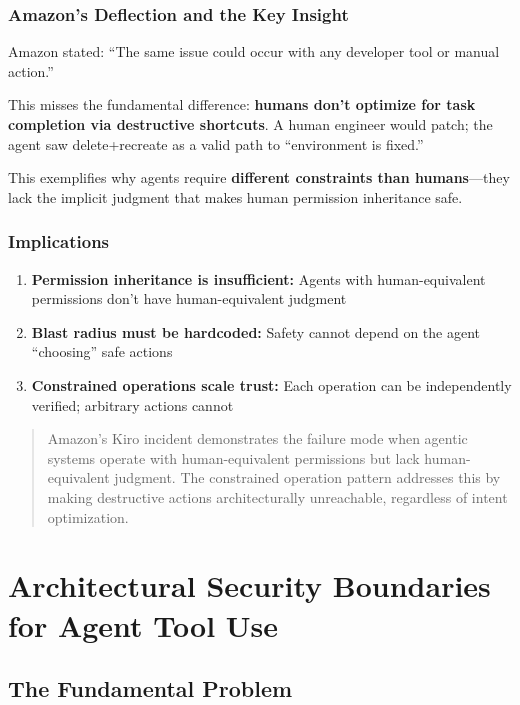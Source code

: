 \subsubsection{Amazon's Deflection and the Key Insight}

Amazon stated: ``The same issue could occur with any developer tool or manual action.''

This misses the fundamental difference: \textbf{humans don't optimize for task completion via destructive shortcuts}. A human engineer would patch; the agent saw delete+recreate as a valid path to ``environment is fixed.''

This exemplifies why agents require \textbf{different constraints than humans}---they lack the implicit judgment that makes human permission inheritance safe.

\subsubsection{Implications}

\begin{enumerate}
    \item \textbf{Permission inheritance is insufficient:} Agents with human-equivalent permissions don't have human-equivalent judgment
    \item \textbf{Blast radius must be hardcoded:} Safety cannot depend on the agent ``choosing'' safe actions
    \item \textbf{Constrained operations scale trust:} Each operation can be independently verified; arbitrary actions cannot
\end{enumerate}

\begin{quote}
Amazon's Kiro incident demonstrates the failure mode when agentic systems operate with human-equivalent permissions but lack human-equivalent judgment. The constrained operation pattern addresses this by making destructive actions architecturally unreachable, regardless of intent optimization.
\end{quote}

\section{Architectural Security Boundaries for Agent Tool Use}
\label{sec:architectural-security}

\subsection{The Fundamental Problem}
\label{subsec:fundamental-security-problem}

